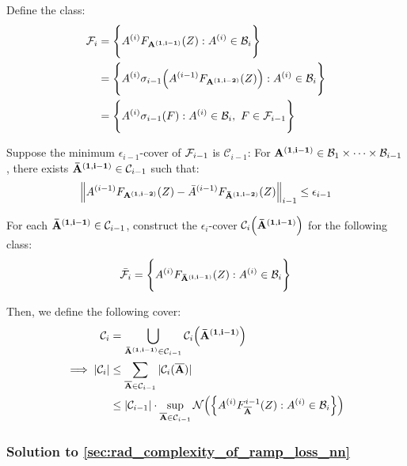 \begin{proof*}
    
    \noindent Define the class:
    \begin{align*}
        \mathcal{F}_i &= \Bigg\{ 
            A^{(i)}F_{\bf A^{(1, i-1)}}(Z) : A^{(i)} \in \mathcal{B}_i        
         \Bigg\} \\
        &= \Bigg\{ 
            A^{(i)}\sigma_{i-1}\Big( 
                A^{(i-1)}F_{\bf A^{(1, i-2)}}(Z)
             \Big) : A^{(i)} \in \mathcal{B}_i
         \Bigg\} \\
        &= \Bigg\{ 
            A^{(i)}\sigma_{i-1}(F): A^{(i)} \in \mathcal{B}_i, \ F \in \mathcal{F}_{i-1}
         \Bigg\}
    \end{align*}


    \noindent Suppose the minimum $\epsilon_{i-1}$-cover of $\mathcal{F}_{i-1}$ is $\mathcal{C}_{i-1}$: For ${\bf A^{(1, i-1)}}\in\mathcal{B}_1\times\dots\times\mathcal{B}_{i-1}$, there exists ${\bf {\bar A}^{(1,i-1)}} \in \mathcal{C}_{i-1}$ such that:
    \begin{align*}
        \Big\| A^{(i-1)}F_{\bf A^{(1, i-2)}}(Z) - {\bar A}^{(i-1)}F_{\bf {\bar A}^{(1, i-2)}}(Z)\Big\|_{i-1} \le \epsilon_{i-1}
    \end{align*}

    \noindent For each ${\bf {\bar A}^{(1, i-1)}}\in\mathcal{C}_{i-1}$, construct the $\epsilon_i$-cover $\mathcal{C}_i\Big( {\bf {\bar A}^{(1,i-1)}} \Big)$ for the following class:
    \begin{align*}
        \bar {\mathcal{F}}_i = \Bigg\{ A^{(i)}F_{\bf {\bar A}^{(i, i-1)}}(Z):A^{(i)}\in\mathcal{B}_i \Bigg\}
    \end{align*}
    
    \noindent Then, we define the following cover:
    \begin{align*}
        \mathcal{C}_i &= \bigcup_{{\bf {\bar A}^{(1, i-1)}}\in\mathcal{C}_{i-1}}\mathcal{C}_i \Big( {\bf {\bar A}^{(1, i-1)}} \Big)
        \\
        \implies 
        |\mathcal{C}_i| &\le \sum_{{\bf \overline{A}}\in\mathcal{C}_{i-1}}|\mathcal{C}_i({\bf \overline{A}})| \\
        &\le |\mathcal{C}_{i-1}|\cdot\sup_{{\bf \overline{A}}\in\mathcal{C}_{i-1}} \mathcal{N}\Big( 
            \Big\{ 
                A^{(i)}F^{i-1}_{\bf \overline{A}}(Z):A^{(i)}\in\mathcal{B}_i
             \Big\}
         \Big)
    \end{align*}
\end{proof*}


\subsubsection{Solution to \ref{sec:rad_complexity_of_ramp_loss_nn}}

